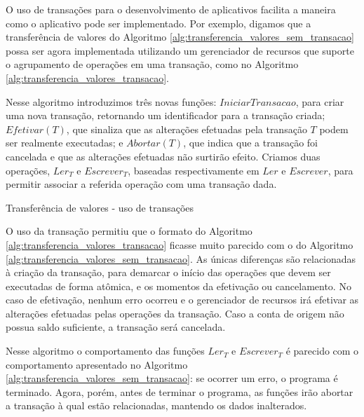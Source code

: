 \documentclass[11pt,twoside,a4paper]{book}
\begin{document}
O uso de transações para o desenvolvimento de aplicativos facilita a maneira como o aplicativo pode ser implementado. Por exemplo, digamos que a transferência de valores do Algoritmo \ref{alg:transferencia_valores_sem_transacao} possa ser agora implementada utilizando um gerenciador de recursos que suporte o agrupamento de operações em uma transação, como no Algoritmo \ref{alg:transferencia_valores_transacao}. 

Nesse algoritmo introduzimos três novas funções: $IniciarTransacao$, para criar uma nova transação, retornando um identificador para a transação criada; $Efetivar(T)$, que sinaliza que as alterações efetuadas pela transação $T$ podem ser realmente executadas; e $Abortar(T)$, que indica que a transação foi cancelada e que as alterações efetuadas não surtirão efeito. Criamos duas operações, $Ler_T$ e $Escrever_T$, baseadas respectivamente em $Ler$ e $Escrever$, para permitir associar a referida operação com uma transação dada.

\begin{algorithm}
\caption{Transferência de valores - uso de transações}
\label{alg:transferencia_valores_transacao}
\end{algorithm}

O uso da transação permitiu que o formato do Algoritmo \ref{alg:transferencia_valores_transacao} ficasse muito parecido com o do Algoritmo \ref{alg:transferencia_valores_sem_transacao}. As únicas diferenças são relacionadas à criação da transação, para demarcar o início das operações que devem ser executadas de forma atômica, e os momentos da efetivação ou cancelamento. No caso de efetivação, nenhum erro ocorreu e o gerenciador de recursos irá efetivar as alterações efetuadas pelas operações da transação. Caso a conta de origem não possua saldo suficiente, a transação será cancelada.

Nesse algoritmo o comportamento das funções $Ler_T$ e $Escrever_T$ é parecido com o comportamento apresentado no Algoritmo \ref{alg:transferencia_valores_sem_transacao}: se ocorrer um erro, o programa é terminado. Agora, porém, antes de terminar o programa, as funções irão abortar a transação à qual estão relacionadas, mantendo os dados inalterados.
\end{document}
